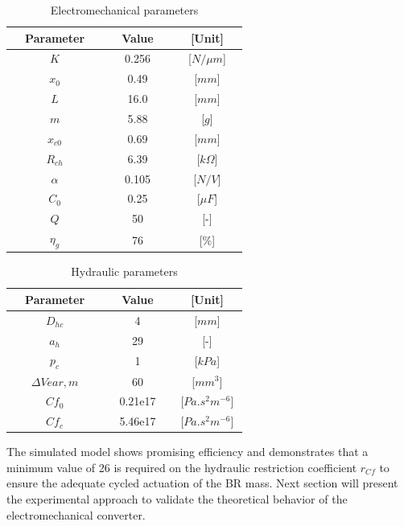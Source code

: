 \documentclass[3p,twocolumn,preprint]{elsarticle}
\begin{document}
\begin{table}	
	\centering
	\begin{tabular}{c|c|c}
\toprule
\multicolumn{1}{c}{~~\textbf{Parameter}~~}  & \multicolumn{1}{c}{~~\textbf{Value}~~} & \multicolumn{1}{c}{~~\textbf{[Unit]}~~}  \\
\midrule
$K$					&	0.256			& [$N/\mu m$]			\\ \hline
$x_0$				&	0.49			& [$mm$] 				\\ \hline
$L$					&	16.0			& [$mm$] 				\\ \hline
$m$					&	5.88			& [$g$] 				\\ \hline
$x_{c0}$			&	0.69			& [$mm$] 				\\ \hline
$R_{ch}$			&	6.39			& [$k\Omega$] 			\\ \hline
$\alpha$			&   0.105			& [$N/V$] 				\\ \hline
$C_0$	   			&	0.25			& [$\mu F$]				\\ \hline
$Q$ 				&	50				& [-] 					\\ \hline
$\eta_g$			& 	76				& [$\%$]		\\ 
\bottomrule
	\end{tabular}
	\caption{Electromechanical parameters}
	\label{tab:parametres électromécaniques}
\end{table}
\begin{table}
	\centering
	\begin{tabular}{c|c|c}
\toprule
\multicolumn{1}{c}{~~\textbf{Parameter}~~}  & \multicolumn{1}{c}{~~\textbf{Value}~~} & \multicolumn{1}{c}{~~\textbf{[Unit]}~~}  \\
\midrule
$D_{hc}$  	   			&	4				& [$mm$]			\\ \hline
$a_h$					&	29				& [-]				\\ \hline
$p_c$					&	1				& [$kPa$]			\\ \hline
$\Delta V{ear,m}$		& 60				& [$mm^3$]			\\ \hline
$Cf_0$					&	0.21e17			&[$Pa.s^2m^{-6}$]	\\ \hline
$Cf_c$					&	5.46e17			&[$Pa.s^2m^{-6}$]	\\
\bottomrule 
	\end{tabular}
	\caption{Hydraulic parameters}
	\label{tab:parametres_hydrauliques}
\end{table}

The simulated model shows promising efficiency and demonstrates that a minimum value of 26 is required on the hydraulic restriction coefficient $r_{Cf}$ to ensure the adequate cycled actuation of the BR mass. Next section will present the experimental approach to validate the theoretical behavior of the electromechanical converter.
\end{document}
